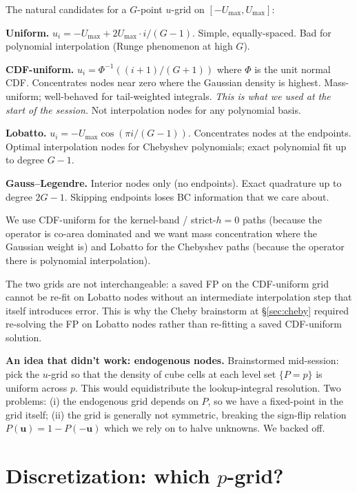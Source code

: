 \documentclass[11pt]{article}
\begin{document}
The natural candidates for a $G$-point $u$-grid on $[-U_{\max}, U_{\max}]$:

\textbf{Uniform.} $u_i = -U_{\max} + 2 U_{\max} \cdot i / (G-1)$. Simple,
equally-spaced. Bad for polynomial interpolation (Runge phenomenon at
high $G$).

\textbf{CDF-uniform.} $u_i = \Phi^{-1}((i+1)/(G+1))$ where $\Phi$ is
the unit normal CDF. Concentrates nodes near zero where the Gaussian
density is highest. Mass-uniform; well-behaved for tail-weighted
integrals. \emph{This is what we used at the start of the session.}
Not interpolation nodes for any polynomial basis.

\textbf{Lobatto.} $u_i = -U_{\max} \cos(\pi i / (G-1))$. Concentrates
nodes at the endpoints. Optimal interpolation nodes for Chebyshev
polynomials; exact polynomial fit up to degree $G - 1$.

\textbf{Gauss--Legendre.} Interior nodes only (no endpoints).
Exact quadrature up to degree $2G - 1$. Skipping endpoints loses BC
information that we care about.

We use CDF-uniform for the kernel-band / strict-$h{=}0$ paths (because
the operator is co-area dominated and we want mass concentration where
the Gaussian weight is) and Lobatto for the Chebyshev paths (because
the operator there is polynomial interpolation).

The two grids are not interchangeable: a saved FP on the CDF-uniform
grid cannot be re-fit on Lobatto nodes without an intermediate
interpolation step that itself introduces error. This is why the
Cheby brainstorm at \S\ref{sec:cheby} required re-solving the FP on
Lobatto nodes rather than re-fitting a saved CDF-uniform solution.

\textbf{An idea that didn't work: endogenous nodes.} Brainstormed
mid-session: pick the $u$-grid so that the density of cube cells at
each level set $\{P = p\}$ is uniform across $p$. This would
equidistribute the lookup-integral resolution. Two problems: (i) the
endogenous grid depends on $P$, so we have a fixed-point in the grid
itself; (ii) the grid is generally not symmetric, breaking the
sign-flip relation $P(\mathbf{u}) = 1 - P(-\mathbf{u})$ which we rely
on to halve unknowns. We backed off.

\section{Discretization: which $p$-grid?}
\end{document}
